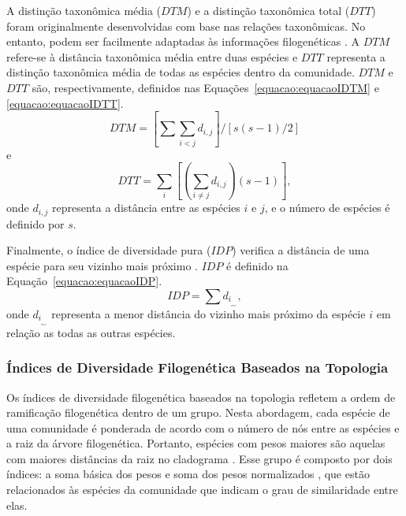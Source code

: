 A distinção taxonômica média ($DTM$) e a distinção taxonômica total ($DTT$) foram originalmente desenvolvidas com base nas relações taxonômicas. No entanto, podem ser facilmente adaptadas às informações filogenéticas \cite{schweiger2008comparative}. A $DTM$ refere-se à distância taxonômica média entre duas espécies \cite{pienkowski1998taxonomic} e $DTT$ representa a distinção taxonômica média de todas as espécies dentro da comunidade. $DTM$ e $DTT$ são, respectivamente, definidos nas Equações~\ref{equacao:equacaoIDTM} e \ref{equacao:equacaoIDTT}.
\begin{equation}
\label{equacao:equacaoIDTM}
DTM = \left [ \sum \sum_{i<j}d_{i,j} \right ] / \left [ s(s - 1)/2 \right ]
\end{equation}
e
\begin{equation}
\label{equacao:equacaoIDTT}
DTT = \sum_{i}\left [ \left ( \sum_{i \neq j}d_{i,j} \right )\left (s - 1  \right ) \right ],
\end{equation}
onde $d_{i,j}$ representa a distância entre as espécies $i$ e $j$, e o número de espécies é definido por $s$.

Finalmente, o índice de diversidade pura ($IDP$) verifica a distância de uma espécie para seu vizinho mais próximo \cite{faith1992conservation}. $IDP$ é definido na Equação~\ref{equacao:equacaoIDP}.
\begin{equation}
\label{equacao:equacaoIDP}
IDP = \sum d_{i} _{ } _{ }_{min},
\end{equation}
onde $d_{i} _{ } _{ }_{min}$ representa a menor distância do vizinho mais próximo da espécie $i$ em relação as todas as outras espécies.

\subsubsection{Índices de Diversidade Filogenética Baseados na Topologia}
\label{sec:indicesT}

Os índices de diversidade filogenética baseados na topologia refletem a ordem de ramificação filogenética dentro de um grupo. Nesta abordagem, cada espécie de uma comunidade é ponderada de acordo com o número de nós entre as espécies e a raiz da árvore filogenética. Portanto, espécies com pesos maiores são aquelas com maiores distâncias da raiz no cladograma \cite{vane1991protect}. Esse grupo é composto por dois índices: a soma básica dos pesos e soma dos pesos normalizados \cite{keith2005taxonomic,posadas2001using,vane1991protect}, que estão relacionados às espécies da comunidade que indicam o grau de similaridade entre elas.


